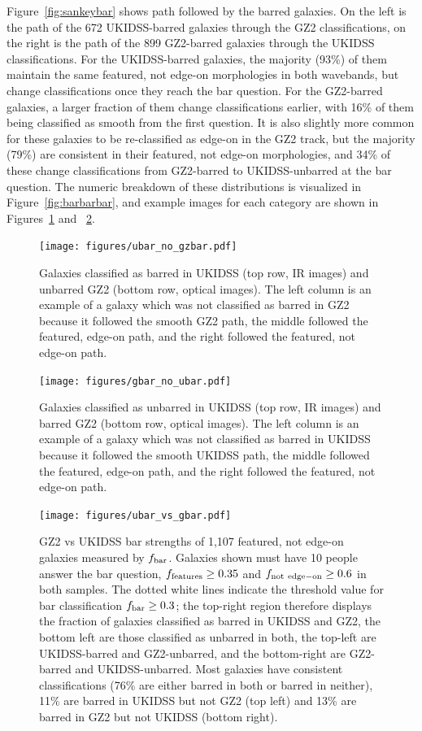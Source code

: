 Figure~\ref{fig:sankeybar} shows path followed by the barred galaxies. On the left is the path of the 672 UKIDSS-barred galaxies through the GZ2 classifications, on the right is the path of the 899 GZ2-barred galaxies through the UKIDSS classifications. For the UKIDSS-barred galaxies, the majority (93\%) of them maintain the same featured, not edge-on morphologies in both wavebands, but change classifications once they reach the bar question. For the GZ2-barred galaxies, a larger fraction of them change classifications earlier, with 16\% of them being classified as smooth from the first question. It is also slightly more common for these galaxies to be re-classified as edge-on in the GZ2 track, but the majority (79\%) are consistent in their featured, not edge-on morphologies, and 34\% of these change classifications from GZ2-barred to UKIDSS-unbarred at the bar question. The numeric breakdown of these distributions is visualized in Figure~\ref{fig:barbarbar}, and example images for each category are shown in Figures~\ref{fig:ubarnogbar} and ~\ref{fig:gbarnoubar}.

\begin{figure}
\centering
\texttt{[image: figures/ubar\_no\_gzbar.pdf]}
\caption{Galaxies classified as barred in UKIDSS (top row, IR images) and unbarred GZ2 (bottom row, optical images). The left column is an example of a galaxy which was not classified as barred in GZ2 because it followed the smooth GZ2 path, the middle followed the featured, edge-on path, and the right followed the featured, not edge-on path.}
\label{fig:ubarnogbar}
\end{figure}


\begin{figure}
\centering
\texttt{[image: figures/gbar\_no\_ubar.pdf]}
\caption{Galaxies classified as unbarred in UKIDSS (top row, IR images) and barred GZ2 (bottom row, optical images). The left column is an example of a galaxy which was not classified as barred in UKIDSS because it followed the smooth UKIDSS path, the middle followed the featured, edge-on path, and the right followed the featured, not edge-on path.}
\label{fig:gbarnoubar}
\end{figure}



\begin{figure}
\centering
\texttt{[image: figures/ubar\_vs\_gbar.pdf]}
\caption{GZ2 vs UKIDSS bar strengths of 1,107 featured, not edge-on galaxies measured by $f_{\rm bar}$. Galaxies shown must have 10 people answer the bar question, $f_{\rm features}\ge0.35$ and $f_{\rm not~edge-on}\ge0.6$ in both samples. The dotted white lines indicate the threshold value for bar classification $f_{\rm bar}\ge0.3$; the top-right region therefore displays the fraction of galaxies classified as barred in UKIDSS and GZ2, the bottom left are those classified as unbarred in both, the top-left are UKIDSS-barred and GZ2-unbarred, and the bottom-right are GZ2-barred and UKIDSS-unbarred. Most galaxies have consistent classifications (76\% are either barred in both or barred in neither), 11\% are barred in UKIDSS but not GZ2 (top left) and 13\% are barred in GZ2 but not UKIDSS (bottom right). } 
\label{fig:ubarvgbar}
\end{figure}

